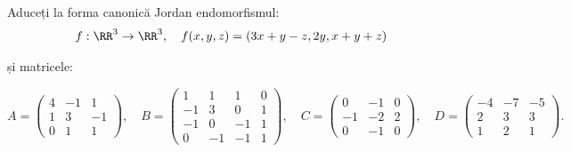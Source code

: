 Aduceți la forma canonică Jordan endomorfismul:
\[
  f : \RR^3 \to \RR^3, \quad f(x, y, z) = (3x + y - z, 2y, x + y + z)
\]

și matricele:

\[
  A = \begin{pmatrix}
    4 & -1 & 1 \\
    1 & 3 & -1 \\
    0 & 1 & 1
  \end{pmatrix}, \quad
  B =
  \begin{pmatrix}
    1 & 1 & 1 & 0 \\
    -1 & 3 & 0 & 1 \\
    -1 & 0 & -1 & 1 \\
    0 & -1 & -1 & 1
  \end{pmatrix}, \quad
  C =
  \begin{pmatrix}
    0 & -1 & 0 \\
    -1 & -2 & 2 \\
    0 & -1 & 0
  \end{pmatrix}, \quad
  D = %
  \begin{pmatrix}
    -4 & -7 & -5 \\
    2 & 3 & 3 \\
    1 & 2 & 1
  \end{pmatrix}.
\]


